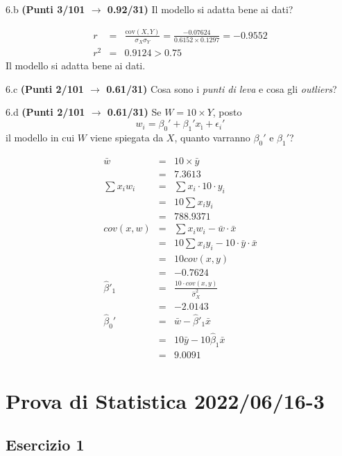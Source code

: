 \documentclass[
  11pt,
]{book}
\theoremstyle{mytheoremstyle}
\theoremstyle{mydefstyle}
\newenvironment{sol}
  {
  \begin{tcolorbox}[enhanced,breakable,arc=0.1mm,boxrule=1pt,colback=white,colframe=iblue,
  title=\bf \fontfamily{lmss}\selectfont \hspace{.5 cm} Soluzione,drop fuzzy shadow]

}{
\end{tcolorbox}
  }
\begin{document}
6.b \textbf{(Punti 3/101 \(\rightarrow\) 0.92/31)} Il modello si adatta bene ai dati?

\begin{sol}
\begin{eqnarray*}
r&=&\frac{\text{cov}(X,Y)}{\sigma_X\sigma_Y}=\frac{ -0.07624 }{ 0.6152 \times 0.1297 }= -0.9552 \\r^2&=& 0.9124 > 0.75
\end{eqnarray*}
Il modello si adatta bene ai dati.

\end{sol}

6.c \textbf{(Punti 2/101 \(\rightarrow\) 0.61/31)} Cosa sono i \emph{punti di leva} e cosa gli \emph{outliers}?

6.d \textbf{(Punti 2/101 \(\rightarrow\) 0.61/31)} Se \(W=10\times Y\), posto
\[w_i=\beta_0'+\beta_1'x_ì +\epsilon_i'\]
il modello in cui \(W\) viene spiegata da \(X\), quanto varranno \(\beta_0'\) e \(\beta_1'\)?

\begin{sol}
\begin{eqnarray*}
  \bar w &=& 10\times \bar y\\
  &=& 7.3613\\
  \sum x_iw_i&=&\sum x_i\cdot 10\cdot y_i\\
  &=& 10\sum x_i y_i\\
  &=& 788.9371\\
  cov(x,w)&=&\sum x_iw_i-\bar w\cdot\bar x\\
  &=&10\sum x_i y_i - 10 \cdot\bar y\cdot\bar x\\
  &=&10 cov(x,y)\\
  &=& -0.7624\\
  \hat\beta'_1&=&\frac{10\cdot cov(x,y)}{\hat\sigma_X^2}\\
  &=&-2.0143\\
  \hat\beta_0'&=& \bar w -\hat\beta'_1\bar x\\
  &=&10\bar y - 10 \hat \beta_1\bar x\\
  &=&9.0091
\end{eqnarray*}

\end{sol}

\section{Prova di Statistica 2022/06/16-3}\label{prova-di-statistica-20220616-3}

\subsection{Esercizio 1}\label{esercizio-1-13}
\end{document}

